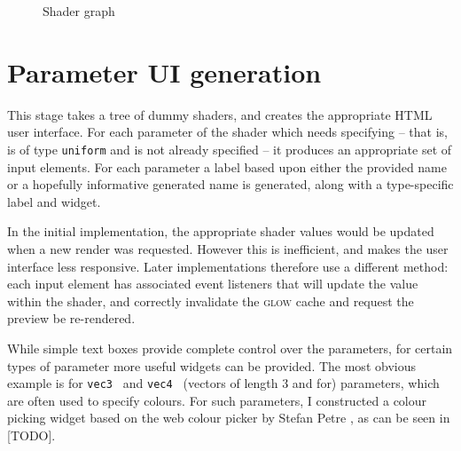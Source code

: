 \documentclass[12pt,twoside,notitlepage]{report}
\begin{document}
\begin{figure}

\caption{Shader graph\label{pipe-graph}}
\end{figure}

\section{Parameter UI generation}
\label{ui-params}
This stage takes a tree of dummy shaders, and creates the appropriate HTML user interface. For each parameter of the shader which needs specifying -- that is, is of type {\tt uniform} and is not already specified -- it produces an appropriate set of input elements. For each parameter a label based upon either the provided name or a hopefully informative generated name is generated, along with a type-specific label and widget.

In the initial implementation, the appropriate shader values would be updated when a new render was requested. However this is inefficient, and makes the user interface less responsive. Later implementations therefore use a different method: each input element has associated event listeners that will update the value within the shader, and correctly invalidate the \textsc{glow} cache and request the preview be re-rendered.

While simple text boxes provide complete control over the parameters, for certain types of parameter more useful widgets can be provided. The most obvious example is for {\tt vec3 } and {\tt vec4 } (vectors of length 3 and for) parameters, which are often used to specify colours. For such parameters, I constructed a colour picking widget based on the web colour picker by Stefan Petre \cite{color}, as can be seen in [TODO].
\end{document}
